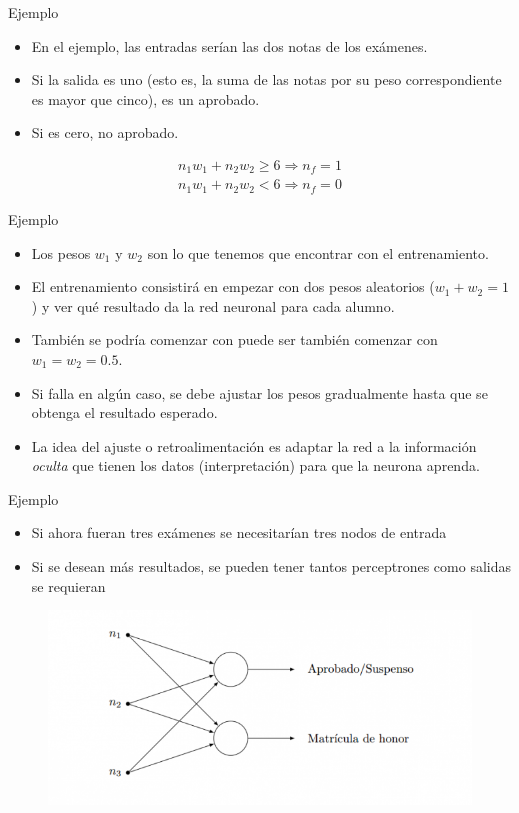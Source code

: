 \documentclass[11pt,aspectratio=169]{beamer}
\begin{document}
\begin{frame}{Ejemplo}
	\begin{itemize}
		\item En el ejemplo, las entradas serían las dos notas de los exámenes. \pause 
		\item Si la salida es uno (esto es, la suma de las notas por su peso correspondiente es mayor que cinco), es un aprobado. \pause
		\item Si es cero, no aprobado. 
	\end{itemize}
	\begin{align*}
		n_1w_1 + n_2w_2 \geq 6  \Rightarrow  n_f=1 \\
		n_1w_1 + n_2w_2 < 6  \Rightarrow n_f=0 
	\end{align*}
\end{frame}

\begin{frame}{Ejemplo}
	\begin{itemize}
		\item Los pesos $w_1$ y $w_2$ son lo que tenemos que encontrar con el entrenamiento.\pause
		\item El entrenamiento consistirá en empezar con dos pesos aleatorios ($w_1+w_2=1$) y ver qué resultado da la red neuronal para cada alumno.\pause
		\item También se podría comenzar con puede ser también comenzar con $w_1=w_2=0.5$.\pause 
		\item Si falla en algún caso, se debe ajustar los pesos gradualmente hasta que se obtenga el resultado esperado.\pause
		\item La idea del ajuste o retroalimentación es adaptar la red a la información \textit{oculta} que tienen los datos (interpretación) 
			para que la neurona aprenda.
	\end{itemize}
\end{frame}

\begin{frame}{Ejemplo}
	\begin{itemize}
		\item Si ahora fueran tres exámenes se necesitarían tres nodos de entrada\pause
		\item Si se desean más resultados, se pueden tener tantos perceptrones como salidas se requieran\pause
	\end{itemize}
	\begin{figure}
		\centering
		\includegraphics[scale=0.65]{img/rn02.png}
	\end{figure}
\end{frame}
\end{document}
